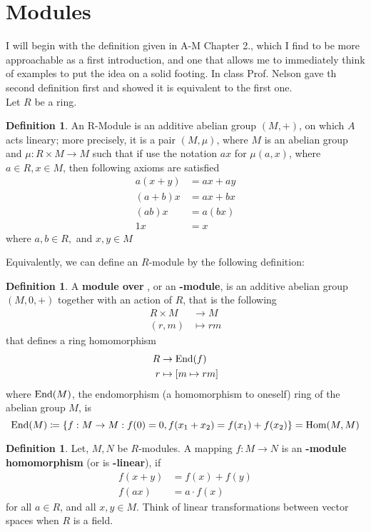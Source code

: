 \documentclass[12pt]{article}
\newcommand{\ita}[1]{\textit{#1}}
\newcommand{\ho}[2]{\textup{Hom}(#1,#2)}
\newcommand{\en}[1]{\textup{End}(#1)}
\newcommand\en{\ita{n }}
\theoremstyle{definition}
\newtheorem{definition}[theorem]{Definition}
\begin{document}
\section*{Modules}
I will begin with the definition given in A-M Chapter 2., which I find to be more approachable as a first introduction, and one that allows me to immediately think of examples to put the idea on a solid footing. In class Prof. Nelson gave th second definition first and showed it is equivalent to the first one.\\
Let $R$ be a ring. 
\begin{definition}
An \textup{R-Module} is an additive abelian group $(M,+)$, on which $A$ acts lineary; more precisely, it is a pair $(M,\mu)$, where $M$ is an abelian group and $\mu:R\times M \rightarrow M $ such that if use the notation $ax$ for $\mu(a,x)$, where $a\in R,x\in M$, then following axioms are satisfied
\begin{align*}
        a(x + y) &= ax +ay \\
    (a +b)x &= ax + bx\\
    (ab)x &= a(bx)\\
    1x&= x
\end{align*}
where $a,b\in R,$ and $x,y\in M$
\end{definition}
Equivalently, we can define an $R$-module by the following definition:
\begin{definition}
A \textbf{module  over }, or an \textbf{-module}, is an additive abelian group $(M,0,+)$ together with an action of $R$, that is the following
\begin{align*}
R\times M &\to M\\
(r,m) & \mapsto rm
\end{align*}
that defines a ring homomorphism
\begin{align*}
R &\to \en{f}\\
r & \mapsto [m\mapsto rm]
\end{align*}
where $\en{M}$, the endomorphism (a homomorphism to oneself) ring of the abelian group $M$, is 
\[
\en{M} \coloneqq \{f:M\rightarrow M: f(0)=0,f(x_1+x_2)=f(x_1)+f(x_2)\} = \ho{M}{M}
\]
\end{definition}
\begin{definition}
Let, $M,N$ be $R$-modules. A mapping $f: M\rightarrow N$ is an \textbf{-module homomorphism} (or is \textbf{-linear}), if
\begin{align*}
    f(x+y) &= f(x)+f(y)\\
    f(ax) &= a\cdot f(x)
\end{align*}
for all $a\in R$, and all $x,y \in M$. Think of linear transformations between vector spaces when $R$ is a field.
\end{definition}
\end{document}
